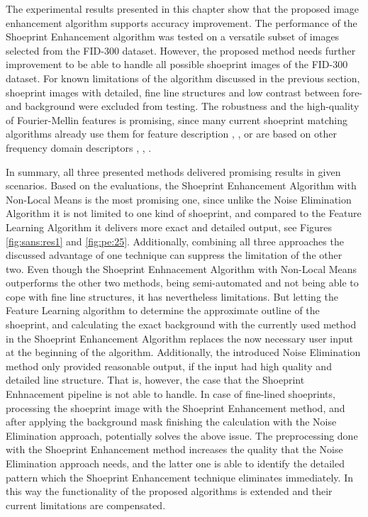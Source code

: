 \documentclass[draft,final]{vutinfth} %
\begin{document}
\par
The experimental results presented in this chapter show that the proposed image enhancement algorithm supports accuracy improvement.
The performance of the Shoeprint Enhancement  algorithm was tested on a versatile subset of images selected from the FID-300 dataset.
However, the proposed method needs further improvement to be able to handle all possible shoeprint images of the FID-300 dataset.
For known limitations of the algorithm discussed in the previous section, shoeprint images with detailed, fine line structures and low contrast between fore- and background were excluded from testing.
The robustness and the high-quality of Fourier-Mellin features is promising, since many current shoeprint matching algorithms already use them for feature description  \cite{gueham2008automatic}, \cite{richetelli2017classification}, \cite{wu2019crime} or are based on other frequency domain descriptors \cite{algarni2008novel}, \cite{wang2014automatic}, \cite{katireddy2017novel}. 
\par
In summary, all three presented methods delivered promising results in given scenarios.
Based on the evaluations, the Shoeprint Enhancement Algorithm with Non-Local Means is the most promising one, since unlike the Noise Elimination Algorithm it is not limited to one kind of shoeprint, and compared to the Feature Learning Algorithm it delivers more exact and detailed output, see Figures \ref{fig:sans:res1} and \ref{fig:pe:25}.
Additionally, combining all three approaches the discussed advantage of one technique can suppress the limitation of the other two.
Even though the Shoeprint Enhnacement Algorithm with Non-Local Means outperforms the other two methods, being semi-automated and not being able to cope with fine line structures, it has nevertheless limitations. 
But letting the Feature Learning algorithm to determine the approximate outline of the shoeprint, and calculating the exact background with the currently used method in the Shoeprint Enhancement Algorithm replaces the now necessary user input at the beginning of the algorithm.
Additionally, the introduced Noise Elimination method only provided reasonable output, if the input had high quality and detailed line structure.
That is, however, the case that the Shoeprint Enhnacement pipeline is not able to handle. 
In case of fine-lined shoeprints, processing the shoeprint image with the Shoeprint Enhancement method, and after applying the background mask finishing the calculation with the Noise Elimination approach, potentially solves the above issue.
The preprocessing done with the Shoeprint Enhancement method increases the quality that the Noise Elimination approach needs, and the latter one is able to identify the detailed pattern which the Shoeprint Enhancement technique eliminates immediately.
In this way the functionality of the proposed algorithms is extended and their current limitations are compensated.
\end{document}
